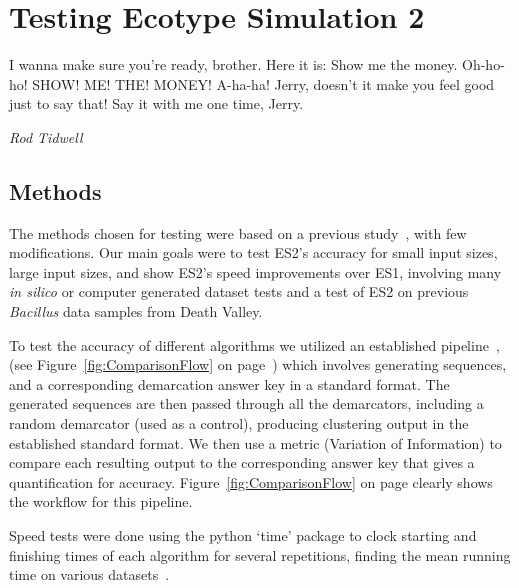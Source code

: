\gobbletocpage
\chapter{Testing Ecotype Simulation 2}
\restoretocpage

\begin{shadequote}
I wanna make sure you're ready, brother. Here it is: Show me the money. Oh-ho-ho! SHOW! ME! THE! MONEY! A-ha-ha! Jerry, doesn't it make you feel good just to say that! Say it with me one time, Jerry. \par\emph{Rod Tidwell}
\end{shadequote}


\section{Methods}
The methods chosen for testing were based on a previous study~\cite{carlo}, with few modifications.
Our main goals were to test ES2's accuracy for small input sizes, large input sizes, and show ES2's speed improvements over ES1, involving many \emph{in silico} or computer generated dataset tests and a test of ES2 on previous \emph{Bacillus} data samples from Death Valley.

To test the accuracy of different algorithms we utilized an established pipeline~\cite{carlo}, (see Figure~\ref{fig:ComparisonFlow} on page~\pageref{fig:ComparisonFlow}) which involves generating sequences, and a corresponding demarcation answer key in a standard format.
The generated sequences are then passed through all the demarcators, including a random demarcator (used as a control), producing clustering output in the established standard format.
We then use a metric (Variation of Information) to compare each resulting output to the corresponding answer key that gives a quantification for accuracy. Figure~\ref{fig:ComparisonFlow} on page \pageref{fig:ComparisonFlow} clearly shows the workflow for this pipeline.

Speed tests were done using the python `time' package to clock starting and finishing times of each algorithm for several repetitions, finding the mean running time on various datasets~\cite{carlo}.

